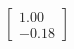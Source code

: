\documentclass[preview]{standalone}
\begin{document}
\begin{align*}
\begin{bmatrix} 1.00 \\ -0.18 \end{bmatrix}
\end{align*}
\end{document}
